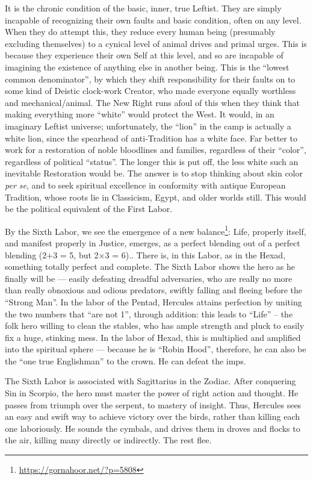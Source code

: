 It is the chronic condition of the basic, inner, true Leftist. They are simply incapable of recognizing their own faults and basic condition, often on any level. When they do attempt this, they reduce every human being (presumably excluding themselves) to a cynical level of animal drives and primal urges. This is because they experience their own Self at this level, and so are incapable of imagining the existence of anything else in another being. This is the ``lowest common denominator'', by which they shift responsibility for their faults on to some kind of Deistic clock-work Creator, who made everyone equally worthless and mechanical/animal. The New Right runs afoul of this when they think that making everything more ``white'' would protect the West. It would, in an imaginary Leftist universe; unfortunately, the ``lion'' in the camp is actually a white lion, since the spearhead of anti-Tradition has a white face. Far better to work for a restoration of noble bloodlines and families, regardless of their ``color'', regardless of political ``status''. The longer this is put off, the less white such an inevitable Restoration would be. The answer is to stop thinking about skin color \emph{per se}, and to seek spiritual excellence in conformity with antique European Tradition, whose roots lie in Classicism, Egypt, and older worlds still. This would be the political equivalent of the First Labor.

By the Sixth Labor, we see the emergence of a new balance\footnote{\url{https://gornahoor.net/?p=5808}}: Life, properly itself, and manifest properly in Justice, emerges, as a perfect blending out of a perfect blending (2+3 = 5, but 2×3 = 6).. There is, in this Labor, as in the Hexad, something totally perfect and complete. The Sixth Labor shows the hero as he finally will be --- easily defeating dreadful adversaries, who are really no more than really obnoxious and odious predators, swiftly falling and fleeing before the ``Strong Man''. In the labor of the Pentad, Hercules attains perfection by uniting the two numbers that ``are not 1'', through addition: this leads to ``Life'' -- the folk hero willing to clean the stables, who has ample strength and pluck to easily fix a huge, stinking mess. In the labor of Hexad, this is multiplied and amplified into the spiritual sphere --- because he is ``Robin Hood'', therefore, he can also be the ``one true Englishman'' to the crown. He can defeat the imps.

The Sixth Labor is associated with Sagittarius in the Zodiac. After conquering Sin in Scorpio, the hero must master the power of right action and thought. He passes from triumph over the serpent, to mastery of insight. Thus, Hercules sees an easy and swift way to achieve victory over the birds, rather than killing each one laboriously. He sounds the cymbals, and drives them in droves and flocks to the air, killing many directly or indirectly. The rest flee.

